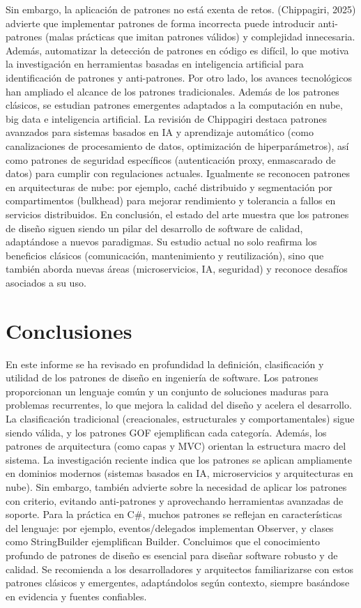 \documentclass[
  11pt,
  letterpaper,
]{article}
\begin{document}
Sin embargo, la aplicación de patrones no está exenta de retos.
(Chippagiri, 2025) advierte que implementar patrones de forma incorrecta
puede introducir anti-patrones (malas prácticas que imitan patrones
válidos) y complejidad innecesaria. Además, automatizar la detección de
patrones en código es difícil, lo que motiva la investigación en
herramientas basadas en inteligencia artificial para identificación de
patrones y anti-patrones. Por otro lado, los avances tecnológicos han
ampliado el alcance de los patrones tradicionales. Además de los
patrones clásicos, se estudian patrones emergentes adaptados a la
computación en nube, big data e inteligencia artificial. La revisión de
Chippagiri destaca patrones avanzados para sistemas basados en IA y
aprendizaje automático (como canalizaciones de procesamiento de datos,
optimización de hiperparámetros), así como patrones de seguridad
específicos (autenticación proxy, enmascarado de datos) para cumplir con
regulaciones actuales. Igualmente se reconocen patrones en arquitecturas
de nube: por ejemplo, caché distribuido y segmentación por
compartimentos (bulkhead) para mejorar rendimiento y tolerancia a fallos
en servicios distribuidos. En conclusión, el estado del arte muestra que
los patrones de diseño siguen siendo un pilar del desarrollo de software
de calidad, adaptándose a nuevos paradigmas. Su estudio actual no solo
reafirma los beneficios clásicos (comunicación, mantenimiento y
reutilización), sino que también aborda nuevas áreas (microservicios,
IA, seguridad) y reconoce desafíos asociados a su uso.

\newpage

\section{Conclusiones}\label{conclusiones}

En este informe se ha revisado en profundidad la definición,
clasificación y utilidad de los patrones de diseño en ingeniería de
software. Los patrones proporcionan un lenguaje común y un conjunto de
soluciones maduras para problemas recurrentes, lo que mejora la calidad
del diseño y acelera el desarrollo. La clasificación tradicional
(creacionales, estructurales y comportamentales) sigue siendo válida, y
los patrones GOF ejemplifican cada categoría. Además, los patrones de
arquitectura (como capas y MVC) orientan la estructura macro del
sistema. La investigación reciente indica que los patrones se aplican
ampliamente en dominios modernos (sistemas basados en IA, microservicios
y arquitecturas en nube). Sin embargo, también advierte sobre la
necesidad de aplicar los patrones con criterio, evitando anti-patrones y
aprovechando herramientas avanzadas de soporte. Para la práctica en C\#,
muchos patrones se reflejan en características del lenguaje: por
ejemplo, eventos/delegados implementan Observer, y clases como
StringBuilder ejemplifican Builder. Concluimos que el conocimiento
profundo de patrones de diseño es esencial para diseñar software robusto
y de calidad. Se recomienda a los desarrolladores y arquitectos
familiarizarse con estos patrones clásicos y emergentes, adaptándolos
según contexto, siempre basándose en evidencia y fuentes confiables.
\end{document}
